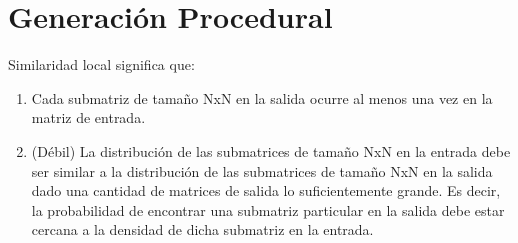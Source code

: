 \chapter*{Generación Procedural}\label{chapter:background}


Similaridad local significa que: 
\begin{enumerate}
    \item Cada submatriz de tamaño NxN en la salida ocurre al menos una vez
        en la matriz de entrada.
    \item (Débil) La distribución de las submatrices de tamaño NxN en la entrada debe ser
        similar a la distribución de las submatrices de tamaño NxN en la salida dado
        una cantidad de matrices de salida lo suficientemente grande. Es decir, la probabilidad
        de encontrar una submatriz particular en la salida debe estar cercana a la densidad
        de dicha submatriz en la entrada. 
\end{enumerate}
